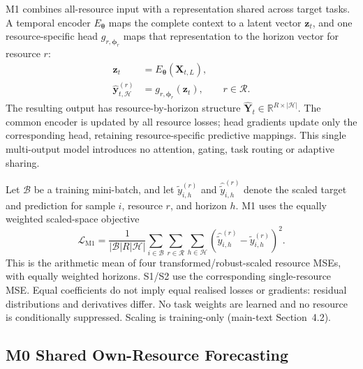 \documentclass[a4paper,11pt]{article}
\begin{document}
M1 combines all-resource input with a representation shared across target
tasks. A temporal encoder $E_{\boldsymbol{\theta}}$ maps the complete context
to a latent vector $\mathbf{z}_t$, and one resource-specific head
$g_{r,\boldsymbol{\phi}_r}$ maps that representation to the horizon vector for
resource $r$:
\begin{equation}
  \begin{aligned}
    \mathbf{z}_t
      &= E_{\boldsymbol{\theta}}(\mathbf{X}_{t,L}), \\
    \widehat{\mathbf{y}}_{t,\mathcal{H}}^{(r)}
      &= g_{r,\boldsymbol{\phi}_r}(\mathbf{z}_t),
      && r\in\mathcal{R}.
  \end{aligned}
  \label{eq:m1-forecast}
\end{equation}
The resulting output has resource-by-horizon structure
$\widehat{\mathbf{Y}}_{t}\in\mathbb{R}^{R\times|\mathcal{H}|}$.
The common encoder is updated by all resource losses; head gradients update
only the corresponding head, retaining resource-specific predictive mappings.
This single multi-output model introduces no attention, gating, task routing
or adaptive sharing.

Let $\mathcal{B}$ be a training mini-batch, and let
$\widetilde{y}_{i,h}^{(r)}$ and
$\widehat{\widetilde{y}}_{i,h}^{(r)}$ denote the scaled target and prediction
for sample $i$, resource $r$, and horizon $h$. M1 uses the equally weighted
scaled-space objective
\begin{equation}
  \mathcal{L}_{\mathrm{M1}}
  = \frac{1}{|\mathcal{B}|R|\mathcal{H}|}
    \sum_{i\in\mathcal{B}}
    \sum_{r\in\mathcal{R}}
    \sum_{h\in\mathcal{H}}
    \left(
      \widehat{\widetilde{y}}_{i,h}^{(r)}
      - \widetilde{y}_{i,h}^{(r)}
    \right)^2.
  \label{eq:m1-loss}
\end{equation}
This is the arithmetic mean of four transformed/robust-scaled resource MSEs,
with equally weighted horizons. S1/S2 use the corresponding single-resource
MSE. Equal coefficients do not imply equal realised losses or gradients:
residual distributions and derivatives differ. No task weights are learned
and no resource is conditionally suppressed. Scaling is training-only
(main-text Section~4.2).

\subsection*{M0 Shared Own-Resource Forecasting}
\end{document}
